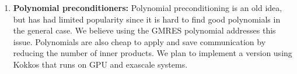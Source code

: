 \begin{enumerate}
	\item \textbf{Polynomial preconditioners:} Polynomial preconditioning is an old idea, but has had limited popularity since it is hard to find good polynomials in the general case. We believe using the GMRES polynomial addresses this issue. Polynomials are also cheap to apply and save communication by reducing the number of inner products. We plan to implement a version using Kokkos that runs on GPU and exascale systems.
\end{enumerate}
